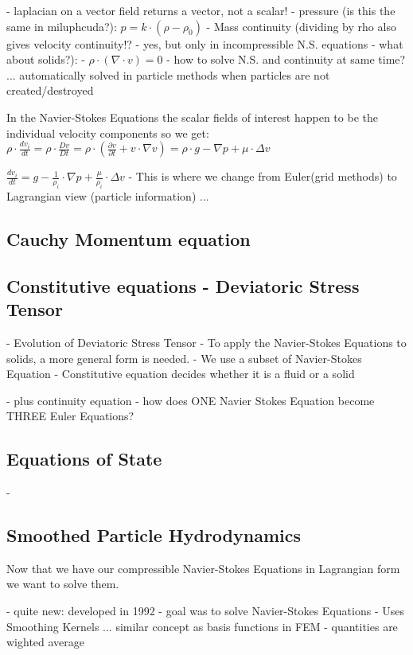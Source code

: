 - laplacian on a vector field returns a vector, not a scalar!
- pressure (is this the same in miluphcuda?):
$ p = k \cdot (\rho - \rho_0) $
- Mass continuity (dividing by rho also gives velocity continuity!? - yes, but only in incompressible N.S. equations - what about solids?):
- $\rho \cdot (\nabla \cdot v) = 0 $
- how to solve N.S. and continuity at same time? ... automatically solved in particle methods when particles are not created/destroyed


In the Navier-Stokes Equations the scalar fields of interest happen to be the individual velocity components so we get:
$\rho \cdot \frac{dv_i}{dt} = \rho \cdot \frac{Dv}{Dt} = \rho \cdot (\frac{\partial v}{\partial t} + v \cdot \nabla v) = \rho \cdot g - \nabla p + \mu \cdot \Delta v $

$ \frac{dv_i}{dt} = g - \frac{1}{\rho_i}\cdot \nabla p + \frac{\mu}{\rho_i} \cdot \Delta  v $
- This is where we change from Euler(grid methods) to Lagrangian view (particle information) ...

\subsection{Cauchy Momentum equation}


\subsection{Constitutive equations - Deviatoric Stress Tensor}
- Evolution of Deviatoric Stress Tensor
- To apply the Navier-Stokes Equations to solids, a more general form is needed.
- We use a subset of Navier-Stokes Equation
- Constitutive equation decides whether it is a fluid or a solid

- plus continuity equation
- how does ONE Navier Stokes Equation become THREE Euler Equations?

\subsection{Equations of State}
-

\subsection{Smoothed Particle Hydrodynamics}
Now that we have our compressible Navier-Stokes Equations in Lagrangian form we want to solve them.

- quite new: developed in 1992
- goal was to solve Navier-Stokes Equations
- Uses Smoothing Kernels ... similar concept as basis functions in FEM
- quantities are wighted average


